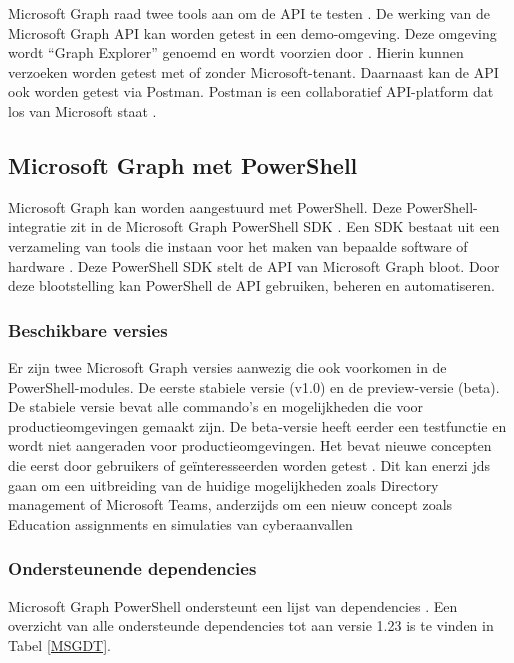 Microsoft Graph raad twee tools aan om de \Ac{API} te testen \autocite{Microsoft2023vv}. De werking van de Microsoft Graph \Ac{API} kan worden getest in een demo-omgeving. Deze omgeving wordt “Graph Explorer” genoemd en wordt voorzien door \textcite{Microsoft2023h}. Hierin kunnen verzoeken worden getest met of zonder Microsoft-tenant. Daarnaast kan de \Ac{API} ook worden getest via Postman. Postman is een collaboratief \ac{API}-platform dat los van Microsoft staat \autocite{Postman2023}.

\subsection{Microsoft Graph met PowerShell}

Microsoft Graph kan worden aangestuurd met PowerShell. Deze PowerShell-integratie zit in de Microsoft Graph PowerShell \ac{SDK} \autocite{Microsoft2023j}. Een \ac{SDK} bestaat uit een verzameling van tools die instaan voor het maken van bepaalde software of hardware \autocite{RedHat2020}. Deze PowerShell \ac{SDK} stelt de \ac{API} van Microsoft Graph bloot. Door deze blootstelling kan PowerShell de \ac{API} gebruiken, beheren en automatiseren.

\subsubsection{Beschikbare versies}

Er zijn twee Microsoft Graph versies aanwezig die ook voorkomen in de PowerShell-modules. De eerste stabiele versie (v1.0) en de preview-versie (beta). De stabiele versie bevat alle commando's en mogelijkheden die voor productieomgevingen gemaakt zijn. De beta-versie heeft eerder een testfunctie en wordt niet aangeraden voor productieomgevingen. Het bevat nieuwe concepten die eerst door gebruikers of geïnteresseerden worden getest \autocite{Microsoft2022e}. Dit kan enerzi
jds gaan om een uitbreiding van de huidige mogelijkheden zoals Directory management of Microsoft Teams, anderzijds om een nieuw concept zoals Education assignments en simulaties van cyberaanvallen \autocite{Microsoft2023w}

\subsubsection{Ondersteunende dependencies}

Microsoft Graph PowerShell ondersteunt een lijst van dependencies \autocite{Microsoft2023k}. Een overzicht van alle ondersteunde dependencies tot aan versie 1.23 is te vinden in Tabel \ref{MSGDT}. 

